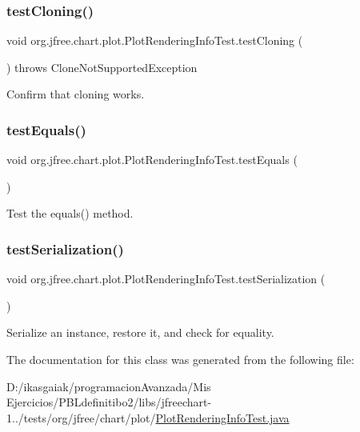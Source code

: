 \subsubsection{\texorpdfstring{test\+Cloning()}{testCloning()}}
{\footnotesize\ttfamily void org.\+jfree.\+chart.\+plot.\+Plot\+Rendering\+Info\+Test.\+test\+Cloning (\begin{DoxyParamCaption}{ }\end{DoxyParamCaption}) throws Clone\+Not\+Supported\+Exception}

Confirm that cloning works. \mbox{\label{classorg_1_1jfree_1_1chart_1_1plot_1_1_plot_rendering_info_test_ae2cde28a10d4ae217251efcb7149a920}} 
\subsubsection{\texorpdfstring{test\+Equals()}{testEquals()}}
{\footnotesize\ttfamily void org.\+jfree.\+chart.\+plot.\+Plot\+Rendering\+Info\+Test.\+test\+Equals (\begin{DoxyParamCaption}{ }\end{DoxyParamCaption})}

Test the equals() method. \mbox{\label{classorg_1_1jfree_1_1chart_1_1plot_1_1_plot_rendering_info_test_a3400783b2517b0297f135c046d66dd41}} 
\subsubsection{\texorpdfstring{test\+Serialization()}{testSerialization()}}
{\footnotesize\ttfamily void org.\+jfree.\+chart.\+plot.\+Plot\+Rendering\+Info\+Test.\+test\+Serialization (\begin{DoxyParamCaption}{ }\end{DoxyParamCaption})}

Serialize an instance, restore it, and check for equality. 

The documentation for this class was generated from the following file\+:\begin{DoxyCompactItemize}
\item 
D\+:/ikasgaiak/programacion\+Avanzada/\+Mis Ejercicios/\+P\+B\+Ldefinitibo2/libs/jfreechart-\/1../tests/org/jfree/chart/plot/\mbox{\hyperlink{_plot_rendering_info_test_8java}{Plot\+Rendering\+Info\+Test.\+java}}\end{DoxyCompactItemize}
